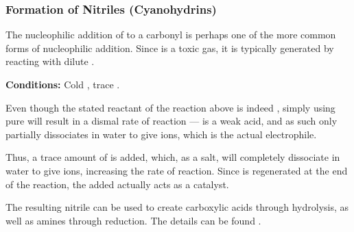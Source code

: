 			\subsubsection{Formation of Nitriles (Cyanohydrins)}

				The nucleophilic addition of  to a carbonyl is perhaps one of the more common forms of nucleophilic addition.
				Since  is a toxic gas, it is typically generated  by reacting  with dilute .


				\vspace{-5mm}


				\vspace{1.5em}
				\vbox{\textbf{Conditions:}	\tabto{35mm}Cold , trace .}


				Even though the stated reactant of the reaction above is indeed , simply using pure  will result in a dismal
				rate of reaction ---  is a weak acid, and as such only partially dissociates in water to give  ions, which is
				the actual electrophile.

				Thus, a trace amount of  is added, which, as a salt, will completely dissociate in water to give  ions,
				increasing the rate of reaction. Since  is regenerated at the end of the reaction, the  added actually
				acts as a catalyst.



				The resulting nitrile can be used to create carboxylic acids through hydrolysis, as well as amines through
				reduction. The details can be found \hyperlink{NitrileUses}{}.

